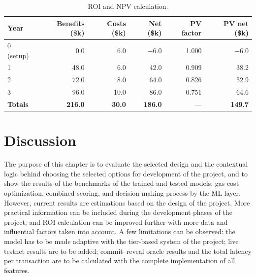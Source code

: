 \documentclass[12pt,a4paper]{report}
\newcommand{\tableheadcolor}{\rowcolor{TableHeadBg}}
\begin{document}
\begin{table}[H]
\centering
\caption[ROI and NPV calculation]{ROI and NPV calculation.}
\label{tab:ch5-roi-calculation}
\small
\begin{tabular}{@{}lrrrrr@{}}
\toprule
\tableheadcolor
\textbf{Year} & \textbf{Benefits (\$k)} & \textbf{Costs (\$k)} & \textbf{Net (\$k)} & \textbf{PV factor} & \textbf{PV net (\$k)} \\
\midrule
0 (setup) & 0.0 & 6.0 & $-$6.0 & 1.000 & $-$6.0 \\
1 & 48.0 & 6.0 & 42.0 & 0.909 & 38.2 \\
2 & 72.0 & 8.0 & 64.0 & 0.826 & 52.9 \\
3 & 96.0 & 10.0 & 86.0 & 0.751 & 64.6 \\
\midrule
\textbf{Totals} & \textbf{216.0} & \textbf{30.0} & \textbf{186.0} & --- & \textbf{149.7} \\
\bottomrule
\end{tabular}
\end{table}

\section{Discussion}
\label{sec:discussion}
\label{sec:research-limitations}

The purpose of this chapter is to evaluate the selected design and the contextual logic behind choosing the selected options for development of the project, and to show the results of the benchmarks of the trained and tested models, gas cost optimization, combined scoring, and decision-making process by the ML layer. However, current results are estimations based on the design of the project. More practical information can be included during the development phases of the project, and ROI calculation can be improved further with more data and influential factors taken into account. A few limitations can be observed: the model has to be made adaptive with the tier-based system of the project; live testnet results are to be added; commit--reveal oracle results and the total latency per transaction are to be calculated with the complete implementation of all features.
\end{document}
